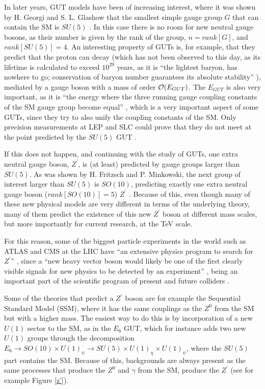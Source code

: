 In later years, GUT models have been of increasing interest, where it was shown by H. Georgi and S. L. Glashow that the smallest simple gauge group $G$ that can contain the SM is $SU(5)$ \cite{Leike}. In this case there is no room for new neutral gauge bosons, as their number is given by the rank of the group, $n=rank[G]$, and $rank[SU(5)] = 4$. An interesting property of GUTs is, for example, that they predict that the proton can decay (which has not been observed to this day, as its lifetime is calculated to exceed $10^{29}$ years, as it is ``the lightest baryon, has nowhere to go; conservation of baryon number guarantees its absolute stability'' \cite{Griffiths}), mediated by a gauge boson with a mass of order $\order{E_{GUT}}$. The $E_{GUT}$ is also very important, as it is ``the energy where the three running gauge coupling constants of the SM gauge group become equal'' \cite{Leike}, which is a very important aspect of some GUTs, since they try to also unify the coupling constants of the SM. Only precision measurements at LEP and SLC could prove that they do not meet at the point predicted by the $SU(5)$ GUT \cite{Griffiths}\cite{Leike}.

If this does not happen, and continuing with the study of GUTs, one extra neutral gauge boson, $Z^{\prime}$, is (at least) predicted by gauge groups larger than $SU(5)$. As was shown by H. Fritzsch and P. Minkowski, the next group of interest larger than $SU(5)$ is $SO(10)$, predicting exactly one extra neutral gauge boson ($rank[SO(10)]=5$) $Z^{\prime}$ \cite{Leike}. Because of this, even though many of these new physical models are very different in terms of the underlying theory, many of them predict the existence of this new $Z^{\prime}$ boson at different mass scales, but more importantly for current research, at the TeV scale. 

For this reason, some of the biggest particle experiments in the world such as ATLAS and CMS at the LHC have ``an extensive physics program to search for $Z^{\prime}$'' \cite{Florez}, since a ``new heavy vector boson would likely be one of the first clearly visible signals for new physics to be detected by an experiment'' \cite{Hayden}, being an important part of the scientific program of present and future colliders \cite{Leike}.

Some of the theories that predict a $Z^{\prime}$ boson are for example the Sequential Standard Model (SSM), where it has the same couplings as the $Z^0$ from the SM but with a higher mass. The easiest way to do this is by incorporation of a new $U(1)$ sector to the SM, as in the $E_6$ GUT, which for instance adds two new $U(1)$ groups through the decomposition $E_6 \rightarrow SO(10)\times U(1)_{\psi} \rightarrow SU(5)\times U(1)_{\chi}\times U(1)_{\psi}$, where the $SU(5)$ part contains the SM. Because of this, backgrounds are always present as the same processes that produce the $Z^0$ and $\gamma$ from the SM, produce the $Z^{\prime}$ \cite{Leike}\cite{Hayden} (see for example Figure \ref{z'}).

